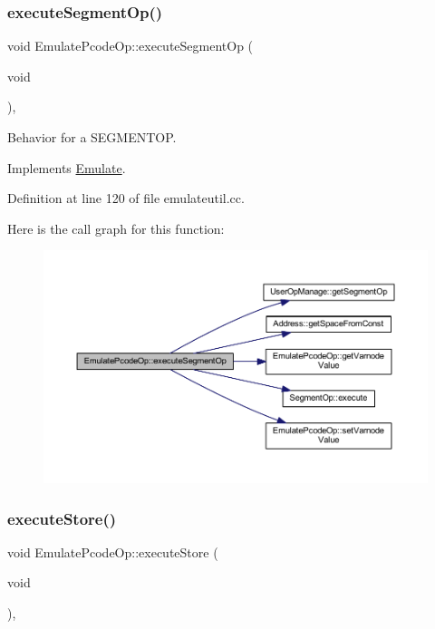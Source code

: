 \subsubsection{\texorpdfstring{executeSegmentOp()}{executeSegmentOp()}}
{\footnotesize\ttfamily void Emulate\+Pcode\+Op\+::execute\+Segment\+Op (\begin{DoxyParamCaption}\item[{void}]{ }\end{DoxyParamCaption})\hspace{0.3cm}{\ttfamily [protected]}, {\ttfamily [virtual]}}



Behavior for a S\+E\+G\+M\+E\+N\+T\+OP. 



Implements \mbox{\hyperlink{class_emulate_ac4c13159c340cd33ca6f3b69d2b50e38}{Emulate}}.



Definition at line 120 of file emulateutil.\+cc.

Here is the call graph for this function\+:
\nopagebreak
\begin{figure}[H]
\begin{center}
\leavevmode
\includegraphics[width=350pt]{class_emulate_pcode_op_a4335b878ca40061dcde8f45fabb82e16_cgraph}
\end{center}
\end{figure}
\mbox{\label{class_emulate_pcode_op_a3e050bb94bc5f0cca844cc60aa0e4702}} 
\subsubsection{\texorpdfstring{executeStore()}{executeStore()}}
{\footnotesize\ttfamily void Emulate\+Pcode\+Op\+::execute\+Store (\begin{DoxyParamCaption}\item[{void}]{ }\end{DoxyParamCaption})\hspace{0.3cm}{\ttfamily [protected]}, {\ttfamily [virtual]}}



